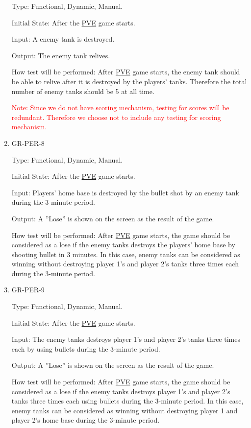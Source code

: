 \documentclass[12pt, titlepage]{article}
\begin{document}
\begin{enumerate}
Type: Functional, Dynamic, Manual.
					
Initial State: After the \underline{PVE} game starts.
					
Input: A enemy tank is destroyed.
					
Output: The enemy tank relives.
					
How test will be performed: After \underline{PVE} game starts, the enemy tank should be able to relive after it is destroyed by the players' tanks. Therefore the total number of enemy tanks should be 5 at all time.

\textcolor{red}{Note: Since we do not have scoring mechanism, testing for scores will be redundant. Therefore we choose not to include any testing for scoring mechanism.}

\item{GR-PER-8\\}

Type: Functional, Dynamic, Manual.
					
Initial State: After the \underline{PVE} game starts.
					
Input: Players' home base is destroyed by the bullet shot by an enemy tank during the 3-minute period.
					
Output: A ”Lose” is shown on the screen as the result of the game.
					
How test will be performed: After \underline{PVE} game starts, the game should be considered as a lose if the enemy tanks destroys the players' home base by shooting bullet in 3 minutes. In this case, enemy tanks can be considered as winning without destroying player 1's and player 2's tanks three times each during the 3-minute period.

\item{GR-PER-9\\}

Type: Functional, Dynamic, Manual.
					
Initial State: After the \underline{PVE} game starts.
					
Input: The enemy tanks destroys player 1's and player 2's tanks three times each by using bullets during the 3-minute period.
					
Output: A ”Lose” is shown on the screen as the result of the game.
					
How test will be performed: After \underline{PVE} game starts, the game should be considered as a lose if the enemy tanks destroys player 1's and player 2's tanks three times each using bullets during the 3-minute period. In this case, enemy tanks can be considered as winning without destroying player 1 and player 2's home base during the 3-minute period.


\end{enumerate}
\end{document}
